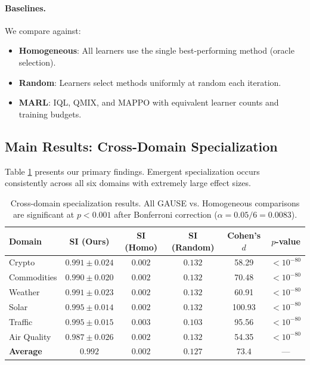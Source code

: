 \documentclass{article}
\begin{document}
\paragraph{Baselines.} We compare against:
\begin{itemize}
    \item \textbf{Homogeneous}: All learners use the single best-performing method (oracle selection).
    \item \textbf{Random}: Learners select methods uniformly at random each iteration.
    \item \textbf{MARL}: IQL, QMIX, and MAPPO with equivalent learner counts and training budgets.
\end{itemize}

\subsection{Main Results: Cross-Domain Specialization}

Table \ref{tab:main_results} presents our primary findings. Emergent specialization occurs consistently across all six domains with extremely large effect sizes.

\begin{table}[t]
\centering
\small
\caption{Cross-domain specialization results. All GAUSE vs. Homogeneous comparisons are significant at $p < 0.001$ after Bonferroni correction ($\alpha = 0.05/6 = 0.0083$).}
\label{tab:main_results}
\begin{tabular}{lccccc}
\toprule
\textbf{Domain} & \textbf{SI (Ours)} & \textbf{SI (Homo)} & \textbf{SI (Random)} & \textbf{Cohen's $d$} & \textbf{$p$-value} \\
\midrule
Crypto & $0.991 \pm 0.024$ & $0.002$ & $0.132$ & 58.29 & $< 10^{-80}$ \\
Commodities & $0.990 \pm 0.020$ & $0.002$ & $0.132$ & 70.48 & $< 10^{-80}$ \\
Weather & $0.991 \pm 0.023$ & $0.002$ & $0.132$ & 60.91 & $< 10^{-80}$ \\
Solar & $0.995 \pm 0.014$ & $0.002$ & $0.132$ & 100.93 & $< 10^{-80}$ \\
Traffic & $0.995 \pm 0.015$ & $0.003$ & $0.103$ & 95.56 & $< 10^{-80}$ \\
Air Quality & $0.987 \pm 0.026$ & $0.002$ & $0.132$ & 54.35 & $< 10^{-80}$ \\
\midrule
\textbf{Average} & $\mathbf{0.992}$ & $0.002$ & $0.127$ & $\mathbf{73.4}$ & --- \\
\bottomrule
\end{tabular}
\end{table}
\end{document}
